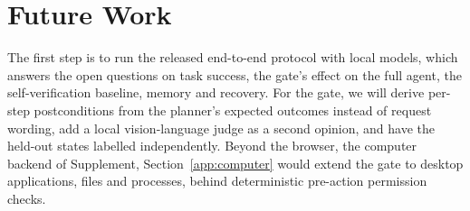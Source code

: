 \section{Future Work}
\label{sec:future}

The first step is to run the released end-to-end protocol with local models, which answers the open questions on task success, the gate's effect on the full agent, the self-verification baseline, memory and recovery. For the gate, we will derive per-step postconditions from the planner's expected outcomes instead of request wording, add a local vision-language judge as a second opinion, and have the held-out states labelled independently. Beyond the browser, the computer backend of Supplement, Section~\ref{app:computer} would extend the gate to desktop applications, files and processes, behind deterministic pre-action permission checks.
